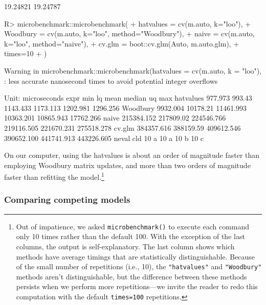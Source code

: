 \documentclass[
]{jss}
\begin{document}
\begin{CodeChunk}
\begin{CodeOutput}
[1] 19.24821 19.24787
\end{CodeOutput}
\begin{CodeInput}
R> microbenchmark::microbenchmark(
+   hatvalues = cv(m.auto, k="loo"),
+   Woodbury = cv(m.auto, k="loo", method="Woodbury"),
+   naive = cv(m.auto, k="loo", method="naive"),
+   cv.glm = boot::cv.glm(Auto, m.auto.glm),
+   times=10
+ )
\end{CodeInput}
\begin{CodeOutput}
Warning in microbenchmark::microbenchmark(hatvalues = cv(m.auto, k = "loo"), :
less accurate nanosecond times to avoid potential integer overflows
\end{CodeOutput}
\begin{CodeOutput}
Unit: microseconds
      expr        min        lq       mean     median         uq        max
 hatvalues    977.973    993.43   1143.433   1173.113   1202.981   1296.256
  Woodbury   9932.004  10178.21  11461.993  10363.201  10865.943  17762.266
     naive 215384.152 217809.02 224546.766 219116.505 221670.231 275518.278
    cv.glm 384357.616 388159.59 409612.546 390652.100 441741.913 443226.605
 neval cld
    10 a  
    10 a  
    10  b 
    10   c
\end{CodeOutput}
\end{CodeChunk}

On our computer, using the hatvalues is about an order of magnitude
faster than employing Woodbury matrix updates, and more than two orders
of magnitude faster than refitting the model.\footnote{Out of
  impatience, we asked \texttt{microbenchmark()} to execute each command
  only 10 times rather than the default 100. With the exception of the
  last columns, the output is self-explanatory. The last column shows
  which methods have average timings that are statistically
  distinguishable. Because of the small number of repetitions (i.e.,
  10), the \texttt{"hatvalues"} and \texttt{"Woodbury"} methods aren't
  distinguishable, but the difference between these methods persists
  when we perform more repetitions---we invite the reader to redo this
  computation with the default \texttt{times=100} repetitions.}

\hypertarget{comparing-competing-models}{%
\subsubsection{Comparing competing
models}\label{comparing-competing-models}}
\end{document}
